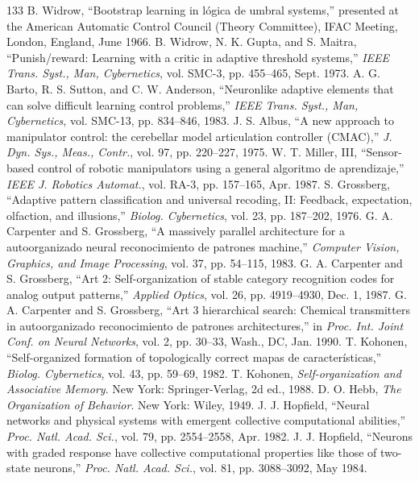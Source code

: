 \documentclass[10pt,twocolumn]{article}
\begin{document}
\begin{thebibliography}{133}
 B. Widrow, ``Bootstrap learning in lógica de umbral systems,'' presented at the American Automatic Control Council (Theory Committee), IFAC Meeting, London, England, June 1966.
 B. Widrow, N. K. Gupta, and S. Maitra, ``Punish/reward: Learning with a critic in adaptive threshold systems,'' \textit{IEEE Trans. Syst., Man, Cybernetics}, vol. SMC-3, pp. 455--465, Sept. 1973.
 A. G. Barto, R. S. Sutton, and C. W. Anderson, ``Neuronlike adaptive elements that can solve difficult learning control problems,'' \textit{IEEE Trans. Syst., Man, Cybernetics}, vol. SMC-13, pp. 834--846, 1983.
 J. S. Albus, ``A new approach to manipulator control: the cerebellar model articulation controller (CMAC),'' \textit{J. Dyn. Sys., Meas., Contr.}, vol. 97, pp. 220--227, 1975.
 W. T. Miller, III, ``Sensor-based control of robotic manipulators using a general algoritmo de aprendizaje,'' \textit{IEEE J. Robotics Automat.}, vol. RA-3, pp. 157--165, Apr. 1987.
 S. Grossberg, ``Adaptive pattern classification and universal recoding, II: Feedback, expectation, olfaction, and illusions,'' \textit{Biolog. Cybernetics}, vol. 23, pp. 187--202, 1976.
 G. A. Carpenter and S. Grossberg, ``A massively parallel architecture for a autoorganizado neural reconocimiento de patrones machine,'' \textit{Computer Vision, Graphics, and Image Processing}, vol. 37, pp. 54--115, 1983.
 G. A. Carpenter and S. Grossberg, ``Art 2: Self-organization of stable category recognition codes for analog output patterns,'' \textit{Applied Optics}, vol. 26, pp. 4919--4930, Dec. 1, 1987.
 G. A. Carpenter and S. Grossberg, ``Art 3 hierarchical search: Chemical transmitters in autoorganizado reconocimiento de patrones architectures,'' in \textit{Proc. Int. Joint Conf. on Neural Networks}, vol. 2, pp. 30--33, Wash., DC, Jan. 1990.
 T. Kohonen, ``Self-organized formation of topologically correct mapas de características,'' \textit{Biolog. Cybernetics}, vol. 43, pp. 59--69, 1982.
 T. Kohonen, \textit{Self-organization and Associative Memory}. New York: Springer-Verlag, 2d ed., 1988.
 D. O. Hebb, \textit{The Organization of Behavior}. New York: Wiley, 1949.
 J. J. Hopfield, ``Neural networks and physical systems with emergent collective computational abilities,'' \textit{Proc. Natl. Acad. Sci.}, vol. 79, pp. 2554--2558, Apr. 1982.
 J. J. Hopfield, ``Neurons with graded response have collective computational properties like those of two-state neurons,'' \textit{Proc. Natl. Acad. Sci.}, vol. 81, pp. 3088--3092, May 1984.

\end{thebibliography}
\end{document}
